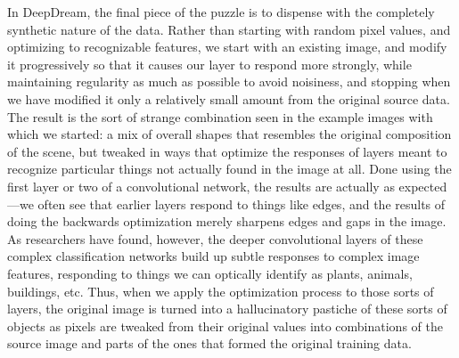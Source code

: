 \documentclass[leqno,12pt]{article}
\begin{document}
In DeepDream, the final piece of the puzzle is to dispense with the completely synthetic nature of the data.
Rather than starting with random pixel values, and optimizing to recognizable features, we start with an
existing image, and modify it progressively so that it causes our layer to respond more strongly, while
maintaining regularity as much as possible to avoid noisiness, and stopping when we have modified it only a
relatively small amount from the original source data.  The result is the sort of strange combination seen in
the example images with which we started:  a mix of overall shapes that resembles the original composition of
the scene, but tweaked in ways that optimize the responses of layers meant to recognize particular things not
actually found in the image at all.  Done using the first layer or two of a convolutional network, the results
are actually as expected---we often see that earlier layers respond to things like edges, and the results of
doing the backwards optimization merely sharpens edges and gaps in the image.  As researchers have found,
however, the deeper convolutional layers of these complex classification networks build up subtle responses to
complex image features, responding to things we can optically identify as plants, animals, buildings, etc.
Thus, when we apply the optimization process to those sorts of layers, the original image is turned
into a hallucinatory pastiche of these sorts of objects as pixels are tweaked from their original values into
combinations of the source image and parts of the ones that formed the original training data.


\pagebreak

\singlespacing


 
\end{document}
